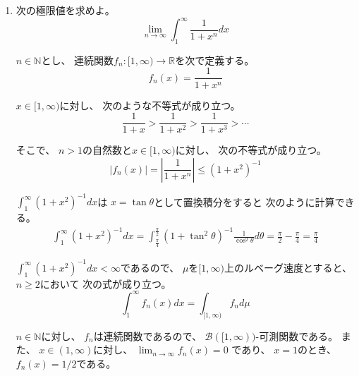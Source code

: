\documentclass[12pt,b5paper]{ltjsarticle}
\begin{document}
\hrulefill

\begin{enumerate}

 \item
      次の極限値を求めよ。
      \begin{equation}
       \lim_{n\to \infty}
        \int_{1}^{\infty} \frac{1}{1+x^{n}}dx
      \end{equation}

      \dotfill

      $n\in\mathbb{N}$とし、
      連続関数$f_{n}:[1,\infty)\to\mathbb{R}$を次で定義する。
      \begin{equation}
       f_{n}(x) = \frac{1}{1+x^{n}}
      \end{equation}

      $x\in [1,\infty)$に対し、
      次のような不等式が成り立つ。
      \begin{equation}
       \frac{1}{1+x}
        > \frac{1}{1+x^{2}}
        > \frac{1}{1+x^{3}}
        > \cdots
      \end{equation}

      そこで、
      $n>1$の自然数と$x\in [1,\infty)$に対し、
      次の不等式が成り立つ。
      \begin{equation}
       \lvert f_{n}(x) \rvert
        = \left\lvert \frac{1}{1+x^{n}} \right\rvert
        \leq (1+x^{2})^{-1}
      \end{equation}

      $\int_{1}^{\infty}(1+x^2)^{-1}dx$は
      $x=\tan\theta$として置換積分をすると
      次のように計算できる。
      \begin{align}
       \int_{1}^{\infty} (1+x^{2})^{-1} dx
       = \int_{\frac{\pi}{4}}^{\frac{\pi}{2}} (1+\tan^{2}\theta)^{-1} \frac{1}{\cos^{2}\theta}d\theta
       = \frac{\pi}{2} - \frac{\pi}{4} = \frac{\pi}{4}
      \end{align}

      $\int_{1}^{\infty}(1+x^{2})^{-1}dx < \infty$であるので、
      $\mu$を$[1,\infty)$上のルベーグ速度とすると、
      $n\geq 2$において
      次の式が成り立つ。
      \begin{equation}
       \int_{1}^{\infty} f_{n}(x) dx
        = \int_{[1,\infty)} f_{n} d\mu
      \end{equation}

      $n\in\mathbb{N}$に対し、
      $f_{n}$は連続関数であるので、
      $\mathcal{B}([1,\infty))$-可測関数である。
      また、
      $x\in(1,\infty)$に対し、
      $\lim_{n\to\infty} f_{n}(x) =0$
      であり、
      $x=1$のとき、
      $f_{n}(x)=1/2$である。


\end{enumerate}
\end{document}
